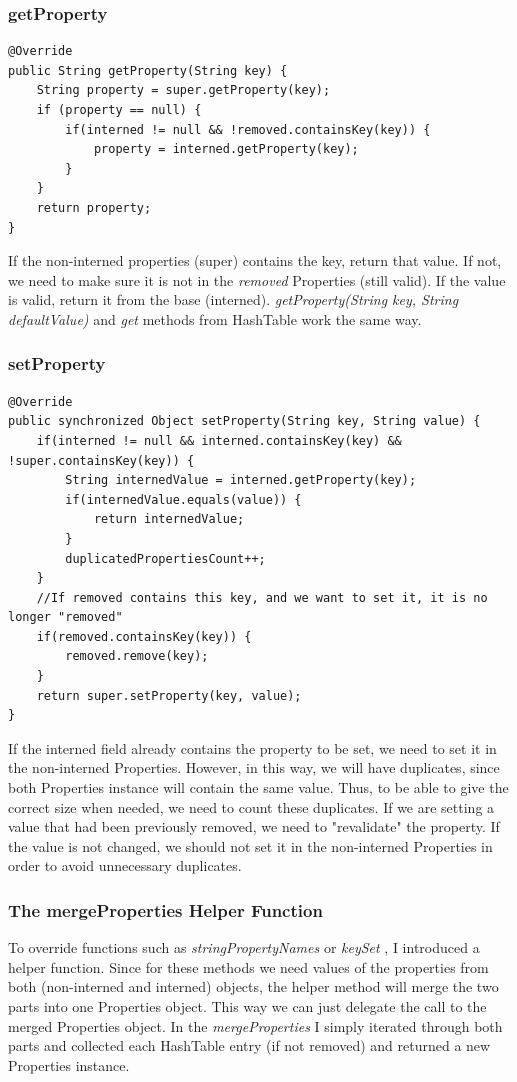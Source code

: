 \subsubsection{getProperty}
\begin{lstlisting}
@Override
public String getProperty(String key) {
	String property = super.getProperty(key);
	if (property == null) {
		if(interned != null && !removed.containsKey(key)) {
			property = interned.getProperty(key);
		}
	}
	return property;
}
\end{lstlisting}

If the non-interned properties (super) contains the key, return that value. If not, we need to make sure it is not in the \textit{removed} Properties (still valid). If the value is valid, return it from the base (interned). \textit{getProperty(String key, String defaultValue)} and \textit{get} methods from HashTable work the same way. 
\subsubsection{setProperty}
\begin{lstlisting}
@Override
public synchronized Object setProperty(String key, String value) {
	if(interned != null && interned.containsKey(key) && !super.containsKey(key)) {
		String internedValue = interned.getProperty(key);
		if(internedValue.equals(value)) {
			return internedValue;
		}
		duplicatedPropertiesCount++;
	}
	//If removed contains this key, and we want to set it, it is no longer "removed"
	if(removed.containsKey(key)) {
		removed.remove(key);
	}
	return super.setProperty(key, value);
}
\end{lstlisting}

If  the interned field already contains the property to be set, we need to set it in the non-interned Properties. However, in this way, we will have duplicates, since both Properties instance will contain the same value. Thus, to be able to give the correct size when needed, we need to count these duplicates. If we are setting a value that had been previously removed, we need to "revalidate" the property. If the value is not changed, we should not set it in the non-interned Properties in order to avoid unnecessary duplicates. 

\subsubsection{The mergeProperties Helper Function}
To override functions such as \textit{stringPropertyNames} or \textit{keySet} \etc, I introduced a helper function. Since for these methods we need values of the properties from both (non-interned and interned) objects, the helper method will merge the two parts into one Properties object. This way we can just delegate the call to the merged Properties object. In the \textit{mergeProperties} I simply iterated through both parts and collected each HashTable entry (if not removed) and returned a new Properties instance. 

